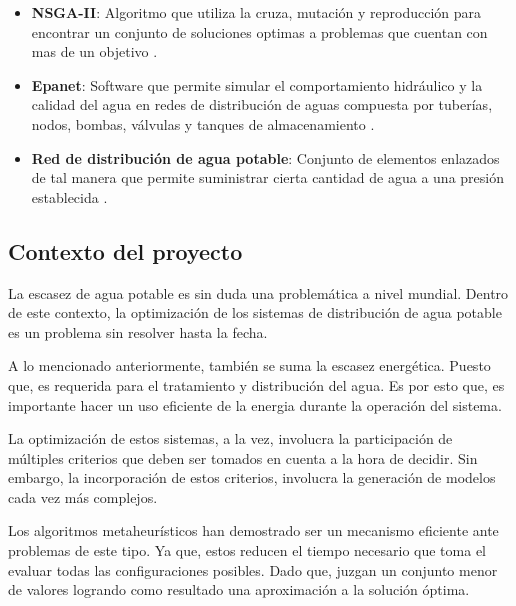 \documentclass[11pt,letterpaper]{article}
\begin{document}
\begin{itemize}
\item \textbf{NSGA-II}: Algoritmo que utiliza la cruza, mutación y reproducción para encontrar un conjunto de soluciones optimas a problemas que cuentan con mas de un objetivo \cite{Deb2002}. 

\item \textbf{Epanet}: Software que permite simular el comportamiento hidráulico y la calidad del agua en redes de distribución de aguas compuesta por tuberías, nodos, bombas, válvulas y tanques de almacenamiento \cite{Rossman2017}. 
\item \textbf{Red de distribución de agua potable}: Conjunto de elementos enlazados de tal manera que permite suministrar cierta cantidad de agua a una presión establecida \cite{Doctoral2012}.
 
\end{itemize}

\subsection{Contexto del proyecto} 

La escasez de agua potable es sin duda una problemática a nivel mundial. Dentro de este contexto, la optimización de los sistemas de distribución de agua potable es un problema sin resolver hasta la fecha. 

A lo mencionado anteriormente, también se suma la escasez energética. Puesto que, es requerida para el tratamiento y distribución del agua. Es por esto que, es importante hacer un uso eficiente de la energia durante la operación del sistema.

La optimización de estos sistemas, a la vez, involucra la participación de múltiples criterios que deben ser tomados en cuenta a la hora de decidir. Sin embargo, la incorporación de estos criterios, involucra la generación de modelos cada vez más complejos.

Los algoritmos metaheurísticos han demostrado ser un mecanismo eficiente ante problemas de este tipo. Ya que, estos reducen el tiempo necesario que toma el evaluar todas las configuraciones posibles. Dado que, juzgan un conjunto menor de valores logrando como resultado una aproximación a la solución óptima.
\end{document}
